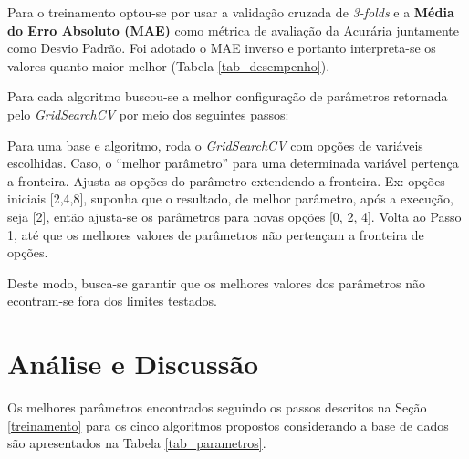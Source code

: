 \documentclass[12pt]{article}
\begin{document}
Para o treinamento optou-se por usar a validação cruzada de \textit{3-folds} e a  \textbf{Média do Erro Absoluto (MAE)} como métrica de avaliação da Acurária juntamente como Desvio Padrão. Foi adotado o MAE inverso e portanto interpreta-se os valores quanto maior melhor (Tabela \ref{tab_desempenho}).  

Para cada algoritmo buscou-se a melhor configuração de parâmetros retornada pelo \textit{GridSearchCV} por meio dos seguintes passos:

\begin{outline}[enumerate]
  \1 Para uma base e algoritmo, roda o \textit{GridSearchCV} com opções de variáveis escolhidas.
\1 Caso, o ``melhor parâmetro'' para uma determinada variável pertença a fronteira.
  \2 Ajusta as opções do parâmetro extendendo a fronteira. Ex: opções iniciais [2,4,8], suponha que o resultado, de melhor parâmetro, após a execução, seja [2], então ajusta-se os parâmetros para novas opções [0, 2, 4].
  \1 Volta ao Passo 1, até que os melhores valores de parâmetros não pertençam a fronteira de opções.
\end{outline}

Deste modo, busca-se garantir que os melhores valores dos parâmetros não econtram-se fora dos limites testados.

\section{Análise e Discussão}

Os melhores parâmetros encontrados seguindo os passos descritos na Seção \ref{treinamento} para os cinco algoritmos propostos considerando a base de dados são apresentados na Tabela \ref{tab_parametros}.
\end{document}
